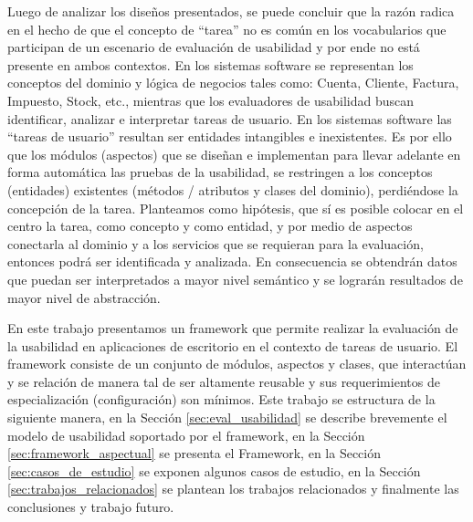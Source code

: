 Luego de analizar los diseños presentados, se puede concluir que la razón radica en el hecho de que el concepto de “tarea” no es común en los vocabularios que participan de un escenario de evaluación de usabilidad y por ende no está presente en ambos contextos. En los sistemas software se representan los conceptos del dominio y lógica de negocios tales como: Cuenta, Cliente, Factura, Impuesto, Stock, etc., mientras que los evaluadores de usabilidad buscan identificar, analizar e interpretar  tareas de usuario. En los sistemas software  las “tareas de usuario” resultan ser entidades intangibles e inexistentes. Es por ello que los módulos (aspectos) que se diseñan e implementan para llevar adelante en forma automática las pruebas de la usabilidad, se restringen a los conceptos (entidades) existentes (métodos / atributos y clases del dominio), perdiéndose la concepción de la tarea. Planteamos como hipótesis, que sí es posible colocar en el centro la tarea, como concepto y como entidad, y por medio de aspectos conectarla al dominio y a los servicios que se requieran para la evaluación, entonces podrá ser identificada y analizada. En consecuencia se obtendrán datos que puedan ser interpretados a mayor nivel semántico y se lograrán resultados de mayor nivel de abstracción. 

En este trabajo presentamos un framework que permite realizar la evaluación de la usabilidad en aplicaciones de escritorio en el contexto de tareas de usuario. El framework consiste de un conjunto de módulos, aspectos y clases, que interactúan y se relación de manera tal de ser altamente reusable y sus requerimientos de especialización (configuración) son mínimos. 
Este trabajo se estructura de la siguiente manera, en la Sección \ref{sec:eval_usabilidad} se describe brevemente el modelo de usabilidad soportado por el framework, en la Sección \ref{sec:framework_aspectual} se presenta el Framework, en la Sección \ref{sec:casos_de_estudio} se exponen algunos casos de estudio, en la Sección \ref{sec:trabajos_relacionados} se plantean los trabajos relacionados y finalmente las conclusiones y trabajo futuro. 
